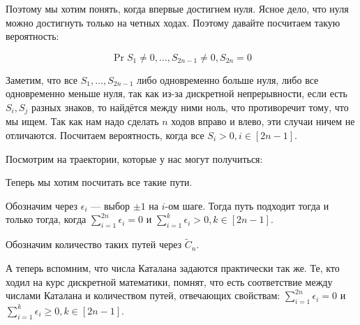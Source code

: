 Поэтому мы хотим понять, когда впервые достигнем нуля. Ясное дело, что нуля 
можно достигнуть только на четных ходах. Поэтому давайте посчитаем такую
вероятность:

\[
  \Pr{S_1 \neq 0, \ldots, S_{2n - 1} \neq 0, S_{2n} = 0}
\]

Заметим, что все $S_1, \ldots, S_{2n - 1}$ либо одновременно больше нуля,
либо все одновременно меньше нуля, так как из-за дискретной непрерывности,
если есть $S_i, S_j$ разных знаков, то найдётся между ними ноль, что 
противоречит тому, что мы ищем. 
Так как нам надо сделать $n$ ходов вправо и влево, эти случаи ничем не отличаются. Посчитаем вероятность, когда все $S_i > 0, i \in [2n - 1]$.

Посмотрим на траектории, которые у нас могут получиться:

\begin{center}
\end{center}

Теперь мы хотим посчитать все такие пути.

Обозначим через $\epsilon_i$ --- выбор $\pm1$ на $i$-ом шаге. Тогда путь подходит 
тогда и только тогда, когда $\sum\limits_{i = 1}^{2n} \epsilon_i = 0$ и
$\sum\limits_{i = 1}^{k} \epsilon_i > 0, k \in [2n - 1]$.

Обозначим количество таких путей через $\tilde{C}_n$.

А теперь вспомним, что числа Каталана задаются практически так же. Те, кто 
ходил на курс дискретной математики, помнят, что есть соответствие между 
числами Каталана и количеством путей, отвечающих свойствам: $\sum\limits_{i = 1}^{
2n} \epsilon_i = 0$ и
$\sum\limits_{i = 1}^{k} \epsilon_i \geq 0, k \in [2n - 1]$.

